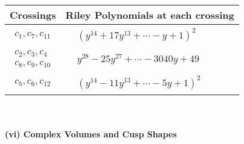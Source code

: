 \documentclass[1p]{elsarticle_modified}
\theoremstyle{definition}
\begin{document}
\begin{tabular}{m{50pt}|m{274pt}}
Crossings & \hspace{64pt}Riley Polynomials at each crossing \\
\hline $$\begin{aligned}c_{1},c_{7},c_{11}\end{aligned}$$&$\begin{aligned}
&(y^{14}+17 y^{13}+\cdots- y+1)^{2}
\end{aligned}$\\
\hline $$\begin{aligned}c_{2},c_{3},c_{4}\\c_{8},c_{9},c_{10}\end{aligned}$$&$\begin{aligned}
&y^{28}-25 y^{27}+\cdots-3040 y+49
\end{aligned}$\\
\hline $$\begin{aligned}c_{5},c_{6},c_{12}\end{aligned}$$&$\begin{aligned}
&(y^{14}-11 y^{13}+\cdots-5 y+1)^{2}
\end{aligned}$\\
\hline
\end{tabular}\\~\\
\newpage\flushleft \textbf{(vi) Complex Volumes and Cusp Shapes}
\end{document}
